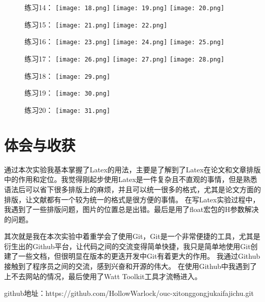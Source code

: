 \documentclass[UTF8]{article}
\begin{document}
\begin{figure}[H]
    \centering
    练习14：
    \texttt{[image: 18.png]}
    \texttt{[image: 19.png]}
    \texttt{[image: 20.png]}
\end{figure}
\begin{figure}[H]
    \centering
    练习15：
    \texttt{[image: 21.png]}
    \texttt{[image: 22.png]}
\end{figure}
\begin{figure}[H]
    \centering
    练习16：
    \texttt{[image: 23.png]}
    \texttt{[image: 24.png]}
    \texttt{[image: 25.png]}
\end{figure}
\begin{figure}[H]
    \centering
    练习17：
    \texttt{[image: 26.png]}
    \texttt{[image: 27.png]}
    \texttt{[image: 28.png]}
\end{figure}
\begin{figure}[H]
    \centering
    练习18：
    \texttt{[image: 29.png]}
\end{figure}
\begin{figure}[H]
    \centering
    练习19：
    \texttt{[image: 30.png]}
\end{figure}
\begin{figure}[H]
    \centering
    练习20：
    \texttt{[image: 31.png]}
\end{figure}



\section{体会与收获}
通过本次实验我基本掌握了Latex的用法，主要是了解到了Latex在论文和文章排版中的作用和定位。我觉得刚起步使用Latex是一件复杂且不直观的事情，但是熟悉语法后可以省下很多排版上的麻烦，并且可以统一很多的格式，尤其是论文方面的排版，让文献都有一个较为统一的格式是很方便的事情。
在写Latex实验过程中，我遇到了一些排版问题，图片的位置总是出错。最后是用了float宏包的H参数解决的问题。

其次就是我在本次实验中着重学会了使用Git，Git是一个非常便捷的工具，尤其是衍生出的Github平台，让代码之间的交流变得简单快捷，我只是简单地使用Git创建了一些文档，但很明显在版本的更迭开发中Git有着更大的作用。
我通过Github接触到了程序员之间的交流，感到兴奋和开源的伟大。
在使用Github中我遇到了上不去网站的情况，最后使用了Watt Toolkit工具才流畅进入。



github地址：https://github.com/HollowWarlock/ouc-xitonggongjukaifajichu.git
\end{document}
